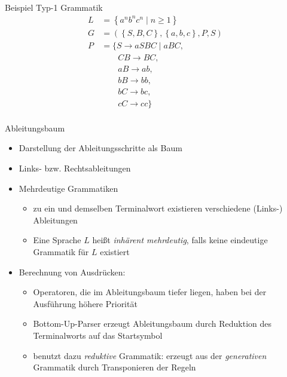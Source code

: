 \begin{frame}{Beispiel Typ-1 Grammatik}
	\begin{align*}
		L&=\left\{a^nb^nc^n \mid n \geq 1\right\}\\
		G&=\left(\left\{S,B,C\right\},\left\{a,b,c\right\},P,S\right)\\
		P&=\{S \rightarrow aSBC \mid aBC,\\
		         &\qquad CB \rightarrow BC,\\
		         &\qquad aB \rightarrow ab,\\
		         &\qquad bB \rightarrow bb,\\
		         &\qquad bC \rightarrow bc,\\
		         &\qquad cC \rightarrow cc\}\\
	\end{align*}
\end{frame}

\begin{frame}{Ableitungsbaum}
	\begin{itemize}
		\item Darstellung der Ableitungsschritte als Baum
		\item Links- bzw. Rechtsableitungen
		\item Mehrdeutige Grammatiken
		\begin{itemize}
			\item zu ein und demselben Terminalwort existieren verschiedene (Links-) Ableitungen
			\item Eine Sprache $L$ heißt \emph{inhärent mehrdeutig}, falls keine eindeutige Grammatik für $L$ existiert
		\end{itemize}
		\item Berechnung von Ausdrücken:
		\begin{itemize}
			\item Operatoren, die im Ableitungsbaum tiefer liegen, haben bei der Ausführung höhere Priorität
			\item Bottom-Up-Parser erzeugt Ableitungsbaum durch Reduktion des Terminalworts auf das Startsymbol
			\item benutzt dazu \emph{reduktive} Grammatik: erzeugt aus der \emph{generativen} Grammatik durch Transponieren der Regeln
		\end{itemize}
	\end{itemize}
\end{frame}


